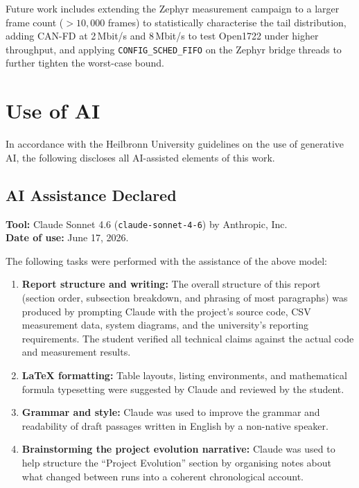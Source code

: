 \documentclass[11pt,a4paper]{article}
\begin{document}
Future work includes extending the Zephyr measurement campaign to a larger frame count
($>10{,}000$ frames) to statistically characterise the tail distribution, adding
CAN-FD at 2\,Mbit/s and 8\,Mbit/s to test Open1722 under higher throughput, and
applying \texttt{CONFIG\_SCHED\_FIFO} on the Zephyr bridge threads to further tighten
the worst-case bound.

\section{Use of AI}
\label{sec:ai}

In accordance with the Heilbronn University guidelines on the use of generative AI, the
following discloses all AI-assisted elements of this work.

\subsection*{AI Assistance Declared}

\textbf{Tool:} Claude Sonnet 4.6 (\texttt{claude-sonnet-4-6}) by Anthropic, Inc. \\
\textbf{Date of use:} June 17, 2026.

The following tasks were performed with the assistance of the above model:

\begin{enumerate}
    \item \textbf{Report structure and writing:} The overall structure of this report
          (section order, subsection breakdown, and phrasing of most paragraphs) was
          produced by prompting Claude with the project's source code, CSV measurement
          data, system diagrams, and the university's reporting requirements.  The
          student verified all technical claims against the actual code and measurement
          results.

    \item \textbf{LaTeX formatting:} Table layouts, listing environments, and
          mathematical formula typesetting were suggested by Claude and reviewed
          by the student.

    \item \textbf{Grammar and style:} Claude was used to improve the grammar and
          readability of draft passages written in English by a non-native speaker.

    \item \textbf{Brainstorming the project evolution narrative:} Claude was used
          to help structure the ``Project Evolution'' section by organising notes about
          what changed between runs into a coherent chronological account.
\end{enumerate}
\end{document}
